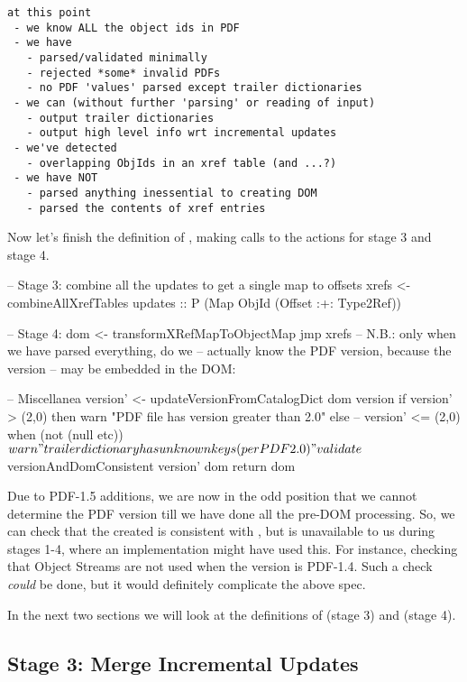 \begin{lstlisting}[style=meta]
at this point
 - we know ALL the object ids in PDF
 - we have
   - parsed/validated minimally
   - rejected *some* invalid PDFs
   - no PDF 'values' parsed except trailer dictionaries
 - we can (without further 'parsing' or reading of input)
   - output trailer dictionaries
   - output high level info wrt incremental updates
 - we've detected
   - overlapping ObjIds in an xref table (and ...?)
 - we have NOT
   - parsed anything inessential to creating DOM
   - parsed the contents of xref entries
\end{lstlisting}

Now let's finish the definition of , making calls
to the actions for stage 3 and stage 4.

\begin{code}  
    -- Stage 3: combine all the updates to get a single map to offsets
    xrefs <- combineAllXrefTables updates
             :: P (Map ObjId (Offset :+: Type2Ref))

    -- Stage 4:
    dom <- transformXRefMapToObjectMap jmp xrefs
    -- N.B.: only when we have parsed everything, do we
    -- actually know the PDF version, because the version
    -- may be embedded in the DOM:

    -- Miscellanea
    version' <- updateVersionFromCatalogDict dom version
    if version' > (2,0) then
      warn "PDF file has version greater than 2.0"
    else
      -- version' <= (2,0)
      when (not (null etc)) $
        warn "trailer dictionary has unknown keys (per PDF 2.0)"
    validate $
      versionAndDomConsistent version' dom
    return dom
\end{code}

Due to PDF-1.5 additions, we are now in the odd position that we cannot
determine the PDF version till we have done all the pre-DOM processing.
So, we can check that the created  is consistent with
,
but  is unavailable to us during stages 1-4, where
an implementation might have used this.
%
For instance, checking that Object Streams are not used when the version is
PDF-1.4.  Such a check \emph{could} be done, but it would definitely complicate
the above spec.

In the next two sections we will look at the definitions of
 (stage 3) and
 (stage 4).

\subsection{Stage 3: Merge Incremental Updates}

